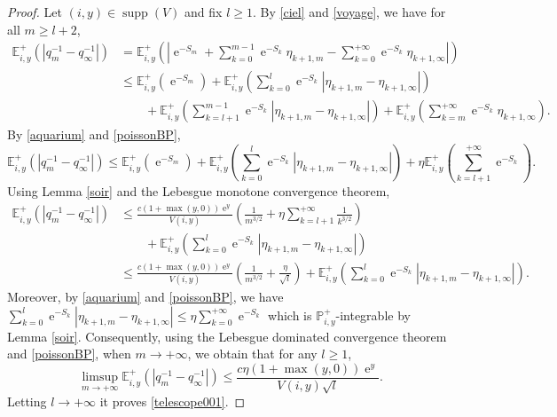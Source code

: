 \documentclass[12pt]{amsart}
\theoremstyle{definition}
\numberwithin{equation}{section}
\newcommand*{\abs}[1]{\left\lvert#1\right\rvert}
\def\bb#1{\mathbb{#1}}
\def\geq{\geqslant}
\def\leq{\leqslant}
\DeclareMathOperator{\e}{e}
\DeclareMathOperator{\supp}{supp}
\begin{document}
\begin{proof}
Let $(i,y) \in \supp (V)$ and fix $l \geq 1$. By \eqref{ciel} and \eqref{voyage}, we have for all $m \geq l+2$,
\begin{align*}
	\bb E_{i,y}^+ \left( \abs{q_m^{-1} - q_{\infty}^{-1}} \right) &= \bb E_{i,y}^+ \left( \abs{\e^{-S_m} + \sum_{k=0}^{m-1} \e^{-S_k} \eta_{k+1,m} - \sum_{k=0}^{+\infty} \e^{-S_k} \eta_{k+1,\infty}}  \right) \\
	&\leq \bb E_{i,y}^+ \left( \e^{-S_m} \right) + \bb E_{i,y}^+ \left( \sum_{k=0}^{l} \e^{-S_k} \abs{\eta_{k+1,m} - \eta_{k+1,\infty}} \right) \\
	&\qquad + \bb E_{i,y}^+ \left( \sum_{k=l+1}^{m-1} \e^{-S_k} \abs{\eta_{k+1,m} - \eta_{k+1,\infty}} \right) + \bb E_{i,y}^+ \left( \sum_{k=m}^{+\infty} \e^{-S_k} \eta_{k+1,\infty} \right).
\end{align*}
By \eqref{aquarium} and \eqref{poissonBP},
\[
\bb E_{i,y}^+ \left( \abs{q_m^{-1} - q_{\infty}^{-1}} \right) \leq \bb E_{i,y}^+ \left( \e^{-S_m} \right) + \bb E_{i,y}^+ \left( \sum_{k=0}^{l} \e^{-S_k} \abs{\eta_{k+1,m} - \eta_{k+1,\infty}} \right) + \eta \bb E_{i,y}^+ \left( \sum_{k=l+1}^{+\infty} \e^{-S_k} \right).
\]
Using Lemma \ref{soir} and the Lebesgue monotone convergence theorem,
\begin{align*}
	\bb E_{i,y}^+ \left( \abs{q_m^{-1} - q_{\infty}^{-1}} \right) &\leq \frac{c \left( 1+\max(y,0) \right)\e^{y}}{V(i,y)} \left( \frac{1}{m^{3/2}} + \eta \sum_{k=l+1}^{+\infty} \frac{1}{k^{3/2}} \right) \\
	&\qquad + \bb E_{i,y}^+ \left( \sum_{k=0}^{l} \e^{-S_k} \abs{\eta_{k+1,m} - \eta_{k+1,\infty}} \right) \\
	&\leq \frac{c \left( 1+\max(y,0) \right)\e^{y}}{V(i,y)} \left( \frac{1}{m^{3/2}} + \frac{\eta}{\sqrt{l}} \right) + \bb E_{i,y}^+ \left( \sum_{k=0}^{l} \e^{-S_k} \abs{\eta_{k+1,m} - \eta_{k+1,\infty}} \right).
\end{align*}
Moreover, by \eqref{aquarium} and \eqref{poissonBP}, we have $\sum_{k=0}^{l} \e^{-S_k} \abs{\eta_{k+1,m} - \eta_{k+1,\infty}} \leq \eta \sum_{k=0}^{+\infty} \e^{-S_k}$ which is $\bb P_{i,y}^+$-integrable by Lemma \ref{soir}. Consequently, using the Lebesgue dominated convergence theorem and \eqref{poissonBP}, when $m \to+\infty$, we obtain that for any $l\geq 1$,
\[
\limsup_{m\to+\infty} \bb E_{i,y}^+ \left( \abs{q_m^{-1} - q_{\infty}^{-1}} \right) \leq \frac{c \eta \left( 1+\max(y,0) \right)\e^{y}}{V(i,y) \sqrt{l}}.
\]
Letting $l\to +\infty$ it proves \eqref{telescope001}.


\end{proof}
\end{document}
